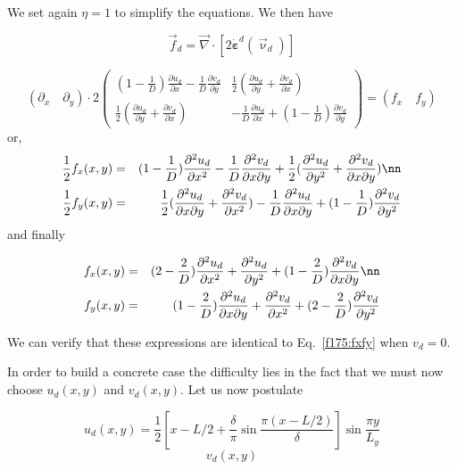 We set again $\eta=1$ to simplify the equations. We then have 

\[
\vec{f}_d = \vec\nabla \cdot [2  \dot{\bm \varepsilon}^d(\vec\upnu_d)  ]  
\]

\[
(\partial_x \quad \partial_y) \cdot 2  
\begin{pmatrix}
(1-\frac{1}{D}) \frac{\partial u_d}{\partial x}- \frac{1}{D} \frac{\partial v_d}{\partial y}
& \frac12 (\frac{\partial u_d}{\partial y}+ \frac{\partial v_d}{\partial x})  \\
\frac12 (\frac{\partial u_d}{\partial y}+ \frac{\partial v_d}{\partial x})  
& -\frac{1}{D} \frac{\partial u_d}{\partial x} + (1- \frac{1}{D})  \frac{\partial v_d}{\partial y} 
\end{pmatrix} 
=(f_x \quad f_y)
\]
or, 
\begin{eqnarray}
\frac12 f_x(x,y) &=&  (1-\frac{1}{D}) \frac{\partial^2 u_d}{\partial x^2}- \frac{1}{D} \frac{\partial^2 v_d}{\partial x\partial y} 
+ \frac12 (\frac{\partial^2 u_d}{\partial y^2}+ \frac{\partial^2 v_d}{\partial x \partial y}) \nn\\
\frac12 f_y(x,y) &=& \frac12 (\frac{\partial^2 u_d}{\partial x \partial y}+ \frac{\partial^2 v_d}{\partial x^2})
 -\frac{1}{D} \frac{\partial^2 u_d}{\partial x \partial y} + (1- \frac{1}{D})  \frac{\partial^2 v_d}{\partial y^2} 
\end{eqnarray}
and finally

\begin{eqnarray}
f_x(x,y) &=&  (2-\frac{2}{D}) \frac{\partial^2 u_d}{\partial x^2}
+  \frac{\partial^2 u_d}{\partial y^2}
+ (1 - \frac{2}{D}) \frac{\partial^2 v_d}{\partial x\partial y}  \nn\\
f_y(x,y) &=& (1 - \frac{2}{D}) \frac{\partial^2 u_d}{\partial x\partial y} 
+ \frac{\partial^2 v_d}{\partial x^2} + (2-\frac{2}{D}) \frac{\partial^2 v_d}{\partial y^2}
\end{eqnarray}

We can verify that these expressions are identical to Eq.~\eqref{f175:fxfy} when $v_d=0$.

In order to build a concrete case the difficulty lies in the fact that we must now 
choose $u_d(x,y)$ and $v_d(x,y)$.
Let us now postulate 

\[
u_d(x,y) = \frac12 \left[ x-L/2 + \frac{\delta }{\pi  }\sin  \frac{ \pi (x-L/2)}{\delta} \right]
\sin \frac{\pi y}{L_y}
\]
\[
v_d(x,y)
\]








